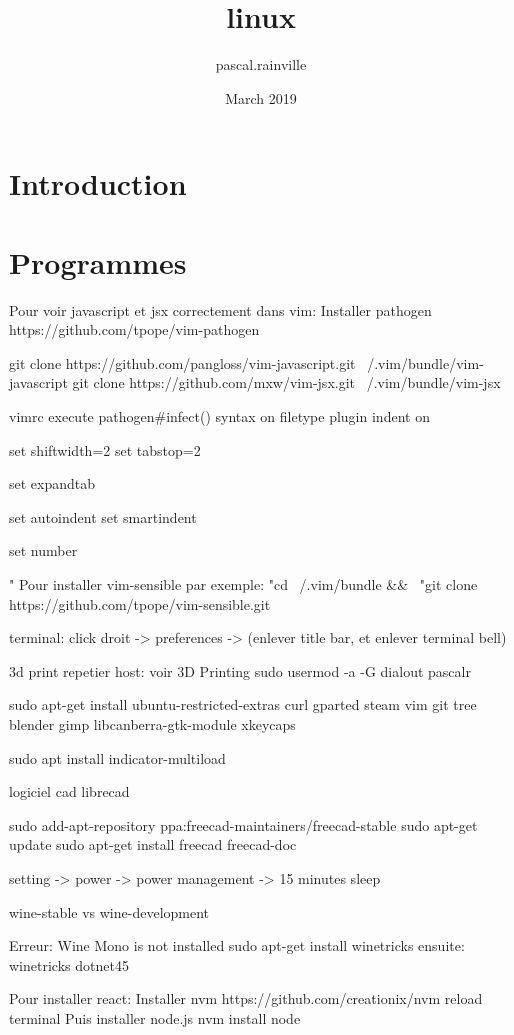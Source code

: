 \documentclass{article}
\title{linux}
\author{pascal.rainville }
\date{March 2019}
\begin{document}
\maketitle

\section{Introduction}

\section{Programmes}
  
Pour voir javascript et jsx correctement dans vim:
Installer pathogen
https://github.com/tpope/vim-pathogen

git clone https://github.com/pangloss/vim-javascript.git ~/.vim/bundle/vim-javascript
git clone https://github.com/mxw/vim-jsx.git ~/.vim/bundle/vim-jsx

vimrc
execute pathogen#infect()
syntax on
filetype plugin indent on

set shiftwidth=2
set tabstop=2

set expandtab

set autoindent
set smartindent

set number

" Pour installer vim-sensible par exemple:
"cd ~/.vim/bundle && \
"git clone https://github.com/tpope/vim-sensible.git
  
terminal:
click droit -> preferences -> (enlever title bar, et enlever terminal bell)


3d print repetier host: voir 3D Printing %
sudo usermod -a -G dialout pascalr

sudo apt-get install ubuntu-restricted-extras curl gparted steam vim git tree blender gimp libcanberra-gtk-module xkeycaps

sudo apt install indicator-multiload

logiciel cad
 librecad

sudo add-apt-repository ppa:freecad-maintainers/freecad-stable
sudo apt-get update
sudo apt-get install freecad freecad-doc

setting -> power -> power management -> 15 minutes sleep

wine-stable vs wine-development

Erreur: Wine Mono is not installed
sudo apt-get install winetricks
ensuite:
winetricks dotnet45

Pour installer react:
Installer nvm
https://github.com/creationix/nvm
reload terminal
Puis installer node.js
nvm install node
\end{document}
